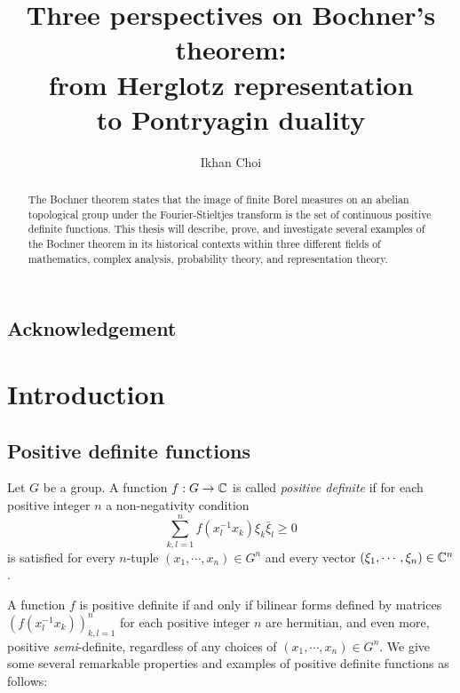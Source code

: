 \documentclass[a4paper]{article}
\title{Three perspectives on Bochner's theorem:\\from Herglotz representation\\to Pontryagin duality}
\author{Ikhan Choi}
\begin{document}
\maketitle
\begin{abstract}
The Bochner theorem states that the image of finite Borel measures on an abelian topological group under the Fourier-Stieltjes transform is the set of continuous positive definite functions.
This thesis will describe, prove, and investigate several examples of the Bochner theorem in its historical contexts within three different fields of mathematics, complex analysis, probability theory, and representation theory.
\end{abstract}
\tableofcontents

\subsection*{Acknowledgement}











\newpage
\section{Introduction}


\subsection{Positive definite functions}
\begin{defn}
Let $G$ be a group.
A function $f:G\to\mathbb{C}$ is called \emph{positive definite} if for each positive integer $n$ a non-negativity condition
\[\sum_{k,l=1}^nf(x_l^{-1}x_k)\xi_k\bar\xi_l\ge0\]
is satisfied for every $n$-tuple $(x_1,\cdots,x_n)\in G^n$ and every vector $(\xi_1,\cdots,\xi_n)\in\mathbb{C}^n$.
\end{defn}
A function $f$ is positive definite if and only if bilinear forms defined by matrices $(f(x_l^{-1}x_k))_{k,l=1}^n$ for each positive integer $n$ are hermitian, and even more, positive \emph{semi}-definite, regardless of any choices of $(x_1,\cdots,x_n)\in G^n$.
We give some several remarkable properties and examples of positive definite functions as follows:
\end{document}
